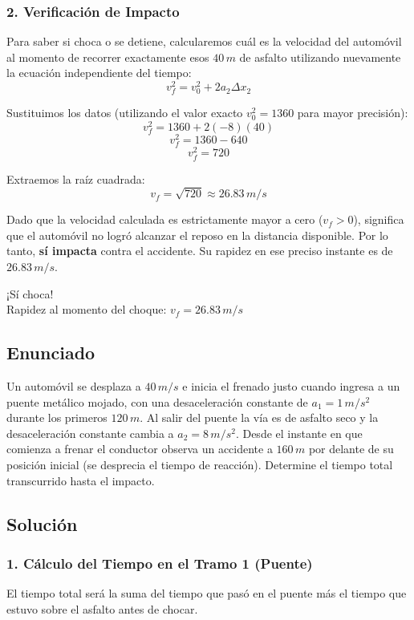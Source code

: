 \documentclass[12pt, a4paper]{article}
\begin{document}
\subsubsection*{2. Verificación de Impacto}
Para saber si choca o se detiene, calcularemos cuál es la velocidad del automóvil al momento de recorrer exactamente esos $40 \, \si{m}$ de asfalto utilizando nuevamente la ecuación independiente del tiempo:
$$ v_f^2 = v_0^2 + 2a_2\Delta x_2 $$

Sustituimos los datos (utilizando el valor exacto $v_0^2 = 1360$ para mayor precisión):
$$ v_f^2 = 1360 + 2(-8)(40) $$
$$ v_f^2 = 1360 - 640 $$
$$ v_f^2 = 720 $$

Extraemos la raíz cuadrada:
$$ v_f = \sqrt{720} \approx 26.83 \, \si{m/s} $$

Dado que la velocidad calculada es estrictamente mayor a cero ($v_f > 0$), significa que el automóvil no logró alcanzar el reposo en la distancia disponible. Por lo tanto, \textbf{sí impacta} contra el accidente. Su rapidez en ese preciso instante es de $26.83 \, \si{m/s}$.

\begin{tcolorbox}[colback=green!5!white, colframe=green!50!black, title=Respuesta Final]
\centering 
\Large ¡Sí choca! \\
\vspace{0.2cm}
\normalsize Rapidez al momento del choque: $v_f = 26.83 \, \si{m/s}$
\end{tcolorbox}

\newpage

\subsection*{Enunciado}
Un automóvil se desplaza a $40 \, \si{m/s}$ e inicia el frenado justo cuando ingresa a un puente metálico mojado, con una desaceleración constante de $a_1 = 1 \, \si{m/s^2}$ durante los primeros $120 \, \si{m}$. Al salir del puente la vía es de asfalto seco y la desaceleración constante cambia a $a_2 = 8 \, \si{m/s^2}$. Desde el instante en que comienza a frenar el conductor observa un accidente a $160 \, \si{m}$ por delante de su posición inicial (se desprecia el tiempo de reacción). Determine el tiempo total transcurrido hasta el impacto.

\subsection*{Solución}

\subsubsection*{1. Cálculo del Tiempo en el Tramo 1 (Puente)}
El tiempo total será la suma del tiempo que pasó en el puente más el tiempo que estuvo sobre el asfalto antes de chocar. 
\end{document}
